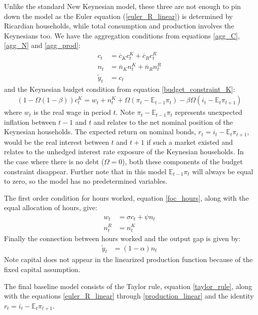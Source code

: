 \documentclass[titlepage]{\econtex}\newcommand{\texname}{ConsumptionHeterogeneity}
\begin{document}
Unlike the standard New Keynesian model, these three are not enough to pin down the model as the Euler equation (\ref{euler_R_linear}) is determined by Ricardian households, while total consumption and production involves the Keynesians too. We have the aggregation conditions from equations \ref{agg_C}, \ref{agg_N} and \ref{agg_prod}:
\begin{align}
c_t &= \overline{c}_{K} c^K_t + \overline{c}_{R} c^R_t \label{agg_C_linear} \\
n_t &= \overline{n}_{K} n^K_t + \overline{n}_{R} n^R_t \label{agg_N_linear} \\
\tilde{y}_t &= c_t \label{agg_prod_linear}
\end{align}
and the Keynesian budget condition from equation \ref{budget_constraint_K}:
\begin{align}
(1-\Omega (1-\beta)) c^K_t = w_t + n^K_t + \Omega \left(\pi_t - \mathbb{E}_{t-1}\pi_t\right) - \beta \Omega  (i_t - \mathbb{E}_t \pi_{t+1})  \label{budget_constraint_K_linear}
\end{align}
where $w_t$ is the real wage in period $t$. Note $\pi_t - \mathbb{E}_{t-1}\pi_t$ represents unexpected inflation between $t-1$ and $t$ and relates to the net nominal position of the Keynesian households. The expected return on nominal bonds, $r_t = i_t - \mathbb{E}_t \pi_{t+1}$, would be the real interest between $t$ and $t+1$ if such a market existed and relates to the unhedged interest rate exposure of the Keynesian households. In the case where there is no debt ($\Omega=0$), both these components of the budget constraint disappear. Further note that in this model $\mathbb{E}_{t-1}\pi_t$ will always be equal to zero, so the model has no predetermined variables.

The first order condition for hours worked, equation \ref{foc_hours}, along with the equal allocation of hours, give:
\begin{align}
w_t &= \sigma c_t + \psi n_t \label{foc_hours_linear} \\
n^R_t &= n^K_t
\end{align}
Finally the connection between hours worked and the output gap is given by:
\begin{align}
\tilde{y}_t &= (1-\alpha)n_t  \label{production_linear}
\end{align}
Note capital does not appear in the linearized production function because of the fixed capital assumption.

The final baseline model consists of the Taylor rule, equation \ref{taylor_rule}, along with the equations \ref{euler_R_linear} through \ref{production_linear} and the identity $r_t = i_t - \mathbb{E}_t \pi_{t+1}$.
\end{document}
